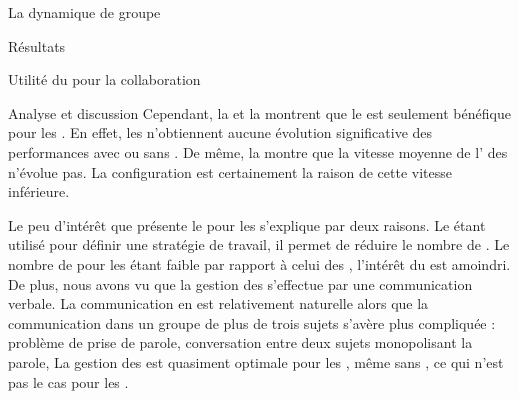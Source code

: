 \documentclass[myfrancais]{mythesis}
\begin{document}
\begin{mychapter}{La dynamique de groupe}
\begin{mysection}{Résultats}
\begin{mysubsection}{Utilité du \mybrainstorming pour la collaboration}
\begin{mysubsubsection}{Analyse et discussion}
					Cependant, la  et la  montrent que le \mybrainstorming est seulement bénéfique pour les .
					En effet, les  n'obtiennent aucune évolution significative des performances avec ou sans \mybrainstorming.
					De même, la  montre que la vitesse moyenne de l' des  n'évolue pas.
					La configuration  est certainement la raison de cette vitesse inférieure.

					Le peu d'intérêt que présente le \mybrainstorming pour les  s'explique par deux raisons.
					Le \mybrainstorming étant utilisé pour définir une stratégie de travail, il permet de réduire le nombre de .
					Le nombre de  pour les  étant faible par rapport à celui des , l'intérêt du \mybrainstorming est amoindri.
					De plus, nous avons vu que la gestion des  s'effectue par une communication verbale.
					La communication en  est relativement naturelle alors que la communication dans un groupe de plus de trois sujets s'avère plus compliquée : problème de prise de parole, conversation entre deux sujets monopolisant la parole, \myetc
					La gestion des  est quasiment optimale pour les , même sans \mybrainstorming, ce qui n'est pas le cas pour les .


\end{mysubsubsection}
\end{mysubsection}
\end{mysection}
\end{mychapter}
\end{document}
